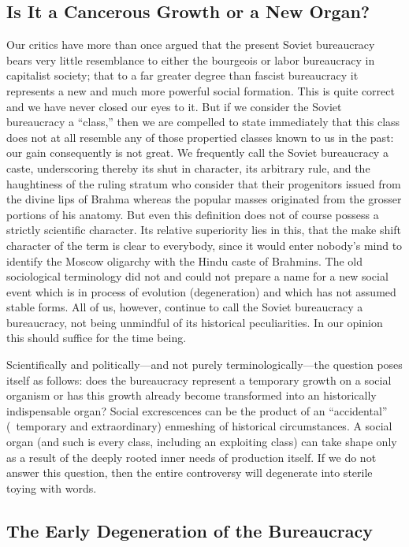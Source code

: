 \subsection*{Is It a Cancerous Growth or a New Organ?}

Our critics have more than once argued that the present Soviet bureaucracy bears very little resemblance to either the bourgeois or labor bureaucracy in capitalist society; that to a far greater degree than fascist bureaucracy it represents a new and much more powerful social formation. This is quite correct and we have never closed our eyes to it. But if we consider the Soviet bureaucracy a “class,” then we are compelled to state immediately that this class does not at all resemble any of those propertied classes known to us in the past: our gain consequently is not great. We frequently call the Soviet bureaucracy a caste, underscoring thereby its shut in character, its arbitrary rule, and the haughtiness of the ruling stratum who consider that their progenitors issued from the divine lips of Brahma whereas the popular masses originated from the grosser portions of his anatomy. But even this definition does not of course possess a strictly scientific character. Its relative superiority lies in this, that the make shift character of the term is clear to everybody, since it would enter nobody’s mind to identify the Moscow oligarchy with the Hindu caste of Brahmins. The old sociological terminology did not and could not prepare a name for a new social event which is in process of evolution (degeneration) and which has not assumed stable forms. All of us, however, continue to call the Soviet bureaucracy a bureaucracy, not being unmindful of its historical peculiarities. In our opinion this should suffice for the time being.

Scientifically and politically---and not purely terminologically---the question poses itself as follows: does the bureaucracy represent a temporary growth on a social organism or has this growth already become transformed into an historically indispensable organ? Social excrescences can be the product of an “accidental” (\ie\ temporary and extraordinary) enmeshing of historical circumstances. A social organ (and such is every class, including an exploiting class) can take shape only as a result of the deeply rooted inner needs of production itself. If we do not answer this question, then the entire controversy will degenerate into sterile toying with words.
\noclub

\subsection*{The Early Degeneration of the Bureaucracy}

